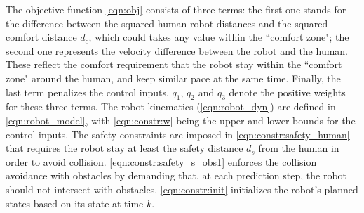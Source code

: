 \documentclass[journal]{IEEEtran}
\begin{document}
	The objective function \cref{eqn:obj} consists of three terms: the first one stands for the difference between the squared human-robot distances and the squared comfort distance $d_c$, which could takes any value within the ``comfort zone"; the second one represents the velocity difference between the robot and the human.
	These reflect the comfort requirement that the robot stay within the ``comfort zone" around the human, and keep similar pace at the same time. 
Finally, the last term penalizes the control inputs.
	$q_1$, $q_2$ and $q_3$ denote the positive weights for these three terms.
	The robot kinematics (\cref{eqn:robot_dyn}) are defined in \cref{eqn:robot_model}, with \cref{eqn:constr:w} being the upper and lower bounds for the control inputs.
    The safety constraints are imposed in \cref{eqn:constr:safety_human} that requires the robot stay at least the safety distance $d_s$ from the human in order to avoid collision.
	\cref{eqn:constr:safety_s_obs1} enforces the collision avoidance with obstacles by demanding that, at each prediction step, the robot should not intersect with obstacles.
    \cref{eqn:constr:init} initializes the robot's planned states based on its state at time $k$.
	
\end{document}
